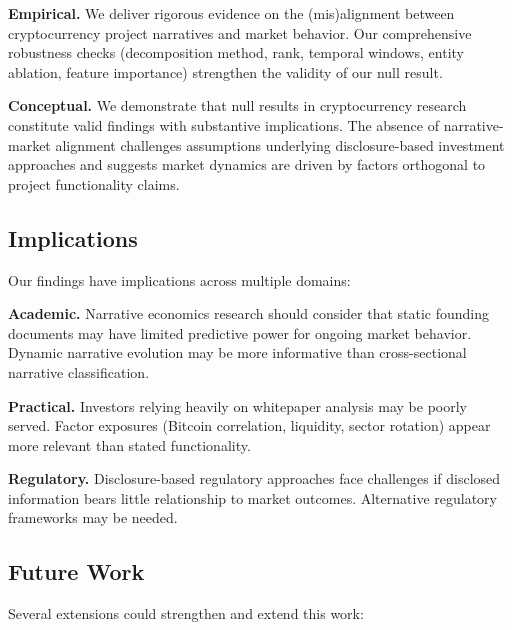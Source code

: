 \documentclass[11pt,twocolumn]{article}
\begin{document}
\textbf{Empirical.} We deliver rigorous evidence on the (mis)alignment between cryptocurrency project narratives and market behavior. Our comprehensive robustness checks (decomposition method, rank, temporal windows, entity ablation, feature importance) strengthen the validity of our null result.

\textbf{Conceptual.} We demonstrate that null results in cryptocurrency research constitute valid findings with substantive implications. The absence of narrative-market alignment challenges assumptions underlying disclosure-based investment approaches and suggests market dynamics are driven by factors orthogonal to project functionality claims.

\subsection{Implications}

Our findings have implications across multiple domains:

\textbf{Academic.} Narrative economics research should consider that static founding documents may have limited predictive power for ongoing market behavior. Dynamic narrative evolution may be more informative than cross-sectional narrative classification.

\textbf{Practical.} Investors relying heavily on whitepaper analysis may be poorly served. Factor exposures (Bitcoin correlation, liquidity, sector rotation) appear more relevant than stated functionality.

\textbf{Regulatory.} Disclosure-based regulatory approaches face challenges if disclosed information bears little relationship to market outcomes. Alternative regulatory frameworks may be needed.

\subsection{Future Work}

Several extensions could strengthen and extend this work:
\end{document}
